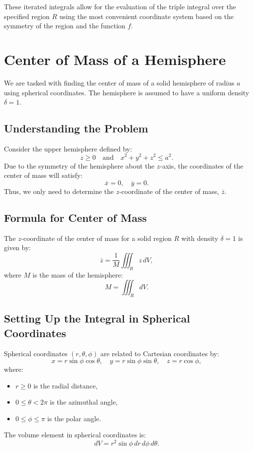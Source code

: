 \documentclass[11pt]{article}
\begin{document}
These iterated integrals allow for the evaluation of the triple integral over the specified region \( R \) using the most convenient coordinate system based on the symmetry of the region and the function \( f \).




\newpage

\section{Center of Mass of a Hemisphere}

We are tasked with finding the center of mass of a solid hemisphere of radius \( a \) using spherical coordinates. The hemisphere is assumed to have a uniform density \( \delta = 1 \).

\newpage

\subsection{Understanding the Problem}

Consider the upper hemisphere defined by:
\[
z \geq 0 \quad \text{and} \quad x^2 + y^2 + z^2 \leq a^2.
\]
Due to the symmetry of the hemisphere about the \( z \)-axis, the coordinates of the center of mass will satisfy:
\[
\overline{x} = 0, \quad \overline{y} = 0.
\]
Thus, we only need to determine the \( z \)-coordinate of the center of mass, \( \overline{z} \).

\newpage

\subsection{Formula for Center of Mass}

The \( z \)-coordinate of the center of mass for a solid region \( R \) with density \( \delta = 1 \) is given by:
\[
\overline{z} = \frac{1}{M} \iiint_{R} z \, dV,
\]
where \( M \) is the mass of the hemisphere:
\[
M = \iiint_{R} dV.
\]

\newpage

\subsection{Setting Up the Integral in Spherical Coordinates}

Spherical coordinates \((r, \theta, \phi)\) are related to Cartesian coordinates by:
\[
x = r \sin\phi \cos\theta, \quad y = r \sin\phi \sin\theta, \quad z = r \cos\phi,
\]
where:
\begin{itemize}
    \item \( r \geq 0 \) is the radial distance,
    \item \( 0 \leq \theta < 2\pi \) is the azimuthal angle,
    \item \( 0 \leq \phi \leq \pi \) is the polar angle.
\end{itemize}
The volume element in spherical coordinates is:
\[
dV = r^2 \sin\phi \, dr \, d\phi \, d\theta.
\]
\end{document}
